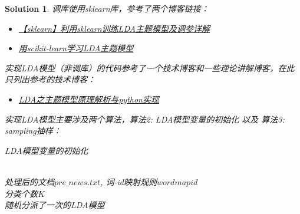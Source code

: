 \documentclass[a4paper,UTF8]{article}
\numberwithin{equation}{section}
\newtheorem*{mySol}{Solution}
\begin{document}
\begin{mySol}
	调库使用sklearn库，参考了两个博客链接：
	\begin{itemize}
		\item[1)] \href{https://blog.csdn.net/TiffanyRabbit/article/details/76445909}{【sklearn】利用sklearn训练LDA主题模型及调参详解}
		\item[2)] \href{https://www.cnblogs.com/pinard/p/6908150.html}{用scikit-learn学习LDA主题模型}
	\end{itemize}
	
	实现LDA模型（非调库）的代码参考了一个技术博客和一些理论讲解博客，在此只列出参考的技术博客：
	\begin{itemize}
		\item[1)] \href{https://www.cnblogs.com/wang2825/articles/8687889.html}{LDA之主题模型原理解析与python实现}
	\end{itemize}

	实现LDA模型主要涉及两个算法，算法2: LDA模型变量的初始化 以及 算法3: sampling抽样：

	\newpage
	\begin{algorithm}[!htb]
		\caption{ LDA模型变量的初始化 }
		\label{alg2}
		 \\
			处理后的文档$pre\_news.txt$, 词-id映射规则$wordmapid$ \\
			分类个数$K$ \\
			随机分派了一次的LDA模型
		\begin{algorithmic}[1]
				\ENDFOR
			\ENDFOR
		\end{algorithmic}
	\end{algorithm}


\end{mySol}
\end{document}
